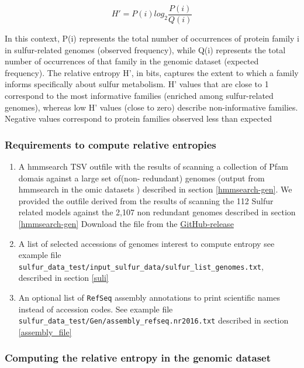 \documentclass[12pt]{report}
\begin{document}
\begin{equation}
  \label{eq:eq1}
  H' = P(i)log_2\frac{P(i)}{Q(i)}
\end{equation}

In this context, P(i) 
represents the total number of occurrences of protein 
family i in sulfur-related genomes (observed frequency), 
while Q(i) represents the total number of occurrences of 
that family in the genomic dataset (expected frequency). The relative entropy H', in bits, captures the extent to which a family informs 
specifically about sulfur metabolism. H' values that are 
close to 1 correspond to the most informative families 
(enriched among sulfur-related genomes), whereas low H'
values (close to zero) describe non-informative families. 
Negative values correspond to protein families observed 
less than expected

\subsubsection*{Requirements to compute relative entropies}
\label{entropies_requirements}
\begin{enumerate}
\item  A hmmsearch TSV outfile with the results of scanning 
a collection of Pfam domais against  a large set of(non-
redundant) genomes (output from hmmsearch in the omic 
datasets ) described in section \ref{hmmsearch-gen}. 
We provided the outfile derived from the results of scanning 
the 112 Sulfur related models  against the 2,107 non redundant genomes described in section \ref{hmmsearch-gen}
Download the file from the   \href{https://github.com/eead-csic-compbio/metagenome_Pfam_score/releases/tag/HMM_gen}{GitHub-release}

\item A list of selected accessions of genomes interest to compute entropy see example file  \verb+sulfur_data_test/input_sulfur_data/sulfur_list_genomes.txt+, described in section \ref{suli}

\item An optional list of \texttt{RefSeq} assembly annotations to print scientific names
instead of accession codes. See example file
\verb+sulfur_data_test/Gen/assembly_refseq.nr2016.txt+ described in section \ref{assembly_file}
\end{enumerate}

\subsubsection*{Computing the relative entropy in the genomic dataset} 
\end{document}
